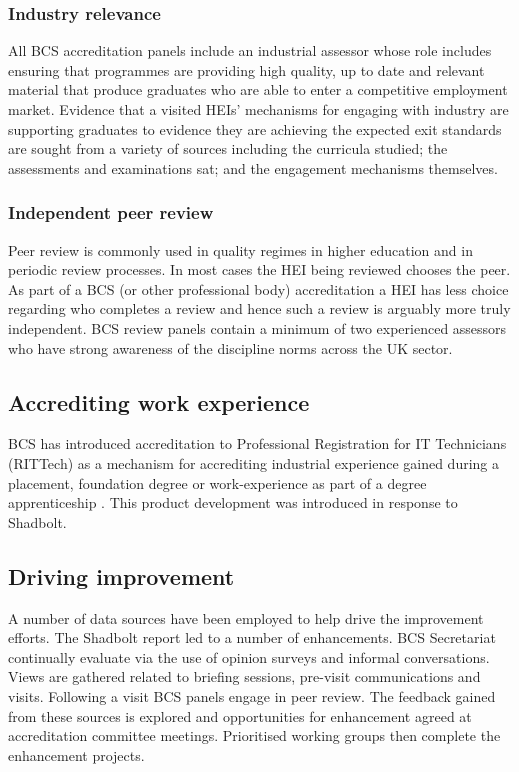 \documentclass[sigconf]{acmart}
\begin{document}
\subsubsection{Industry relevance}
All BCS accreditation panels include an industrial assessor whose role includes ensuring that programmes are providing high quality, up to date and relevant material that produce graduates who are able to enter a competitive employment market. Evidence that a visited HEIs' mechanisms for engaging with industry are supporting graduates to evidence they are achieving the expected exit standards are sought from a variety of sources including the curricula studied; the assessments and examinations sat; and the engagement mechanisms themselves. 
\subsubsection{Independent peer review}
Peer review is commonly used in quality regimes in higher education and in periodic review processes. In most cases the HEI being reviewed chooses the peer. As part of a BCS (or other professional body) accreditation a HEI has less choice regarding who completes a review and hence such a review is arguably more truly independent. BCS review panels contain a minimum of two experienced assessors who have strong awareness of the discipline norms across the UK sector.

\subsection{Accrediting work experience}
BCS has introduced accreditation to Professional Registration for IT Technicians (RITTech) as a mechanism for accrediting industrial experience gained during a placement, foundation degree or work-experience as part of a degree apprenticeship \cite[p8]{BCS2018a}. This product development was introduced in response to Shadbolt.

\subsection{Driving improvement}
A number of data sources have been employed to help drive the improvement efforts. The Shadbolt report led to a number of enhancements. BCS Secretariat continually evaluate via the use of opinion surveys and informal conversations. Views are gathered related to briefing sessions, pre-visit communications and visits. Following a visit BCS panels engage in peer review. The feedback gained from these sources is explored and opportunities for enhancement agreed at accreditation committee meetings. Prioritised working groups then complete the enhancement projects. 
\end{document}
